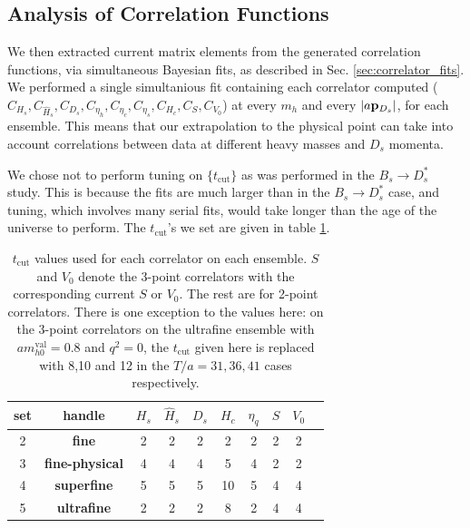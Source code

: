 \subsection{Analysis of Correlation Functions}

We then extracted current matrix elements from the generated correlation functions, via simultaneous Bayesian fits, as described in Sec. \ref{sec:correlator_fits}. We performed a single simultanious fit containing each correlator computed ($C_{H_s},C_{\hat{H}_s},C_{D_s},C_{\eta_h},C_{\eta_c},C_{\eta_s},C_{H_c},C_S,C_{V_0}$) at every $m_h$ and every $|a{\bf{p}}_{D_s}|$, for each ensemble. This means that our extrapolation to the physical point can take into account correlations between data at different heavy masses and $D_s$ momenta.

We chose not to perform tuning on $\{t_{\text{cut}}\}$ as was performed in the $B_s\to D_s^*$ study. This is because the fits are much larger than in the $B_s\to D_s^*$ case, and tuning, which involves many serial fits, would take longer than the age of the universe to perform. The $t_{\text{cut}}$'s we set are given in table \ref{tab:tcuts}.

\begin{table}[htb!]
  \begin{center}
    \begin{tabular}{c c c c c c c c c c}
      \hline
      set & handle & $H_s$ & $\hat{H}_s$ & $D_s$ & $H_c$ & $\eta_q$ & $S$ & $V_0$
      \\ [0.5ex]
      \hline
      2 & \bf{fine} & 2 & 2 & 2 & 2 & 2 & 2 & 2
      \\ [1ex]
      3 & \bf{fine-physical} & 4 & 4 & 4 & 5 & 4 & 2 & 2
      \\ [1ex]
      4 & \bf{superfine} & 5 & 5 & 5 & 10 & 5 & 4 & 4
      \\ [1ex]
      5 & \bf{ultrafine} & 2 & 2 & 2 & 8 & 2 & 4 & 4
      \\ [1ex]
      \hline
    \end{tabular}
  \end{center}
  \caption{$t_{\text{cut}}$ values used for each correlator on each ensemble. $S$ and $V_0$ denote the 3-point correlators with the corresponding current $S$ or $V_0$. The rest are for 2-point correlators. There is one exception to the values here: on the 3-point correlators on the ultrafine ensemble with $am^{\text{val}}_{h0}=0.8$ and $q^2=0$, the $t_{\text{cut}}$ given here is replaced with 8,10 and 12 in the $T/a=31,36,41$ cases respectively. \label{tab:tcuts}}
  \end{table}

